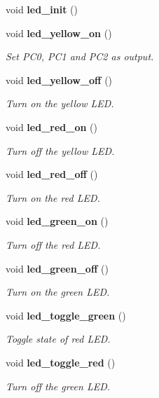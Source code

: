 \begin{CompactItemize}
\item 
void {\bf led\_\-init} ()
\item 
void {\bf led\_\-yellow\_\-on} ()
\begin{CompactList}\small\item\em Set PC0, PC1 and PC2 as output. \item\end{CompactList}\item 
void {\bf led\_\-yellow\_\-off} ()
\begin{CompactList}\small\item\em Turn on the yellow LED. \item\end{CompactList}\item 
void {\bf led\_\-red\_\-on} ()
\begin{CompactList}\small\item\em Turn off the yellow LED. \item\end{CompactList}\item 
void {\bf led\_\-red\_\-off} ()
\begin{CompactList}\small\item\em Turn on the red LED. \item\end{CompactList}\item 
void {\bf led\_\-green\_\-on} ()
\begin{CompactList}\small\item\em Turn off the red LED. \item\end{CompactList}\item 
void {\bf led\_\-green\_\-off} ()
\begin{CompactList}\small\item\em Turn on the green LED. \item\end{CompactList}\item 
void {\bf led\_\-toggle\_\-green} ()
\begin{CompactList}\small\item\em Toggle state of red LED. \item\end{CompactList}\item 
void {\bf led\_\-toggle\_\-red} ()
\begin{CompactList}\small\item\em Turn off the green LED. \item\end{CompactList}\end{CompactItemize}



